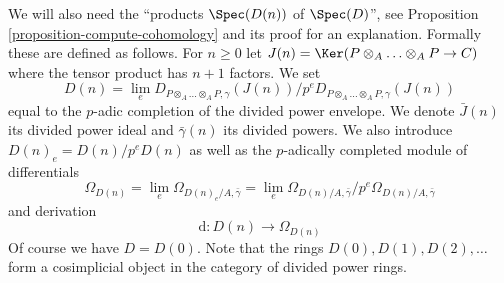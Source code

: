 \medskip\noindent
We will also need the ``products $\Spec(D(n))$ of $\Spec(D)$'', see
Proposition \ref{proposition-compute-cohomology} and its proof for an
explanation. Formally these are defined as follows. For $n \geq 0$ let
$J(n) = \Ker(P \otimes_A \ldots \otimes_A P \to C)$ where
the tensor product has $n + 1$ factors. We set
\begin{equation}
\label{equation-Dn}
D(n) = \lim_e
D_{P \otimes_A \ldots \otimes_A P, \gamma}(J(n))/
p^eD_{P \otimes_A \ldots \otimes_A P, \gamma}(J(n))
\end{equation}
equal to the $p$-adic completion of the divided power envelope.
We denote $\bar J(n)$ its divided power ideal and $\bar \gamma(n)$
its divided powers. We also introduce $D(n)_e = D(n)/p^eD(n)$ as well
as the $p$-adically completed module of differentials
\begin{equation}
\label{equation-omega-Dn}
\Omega_{D(n)} = \lim_e \Omega_{D(n)_e/A, \bar\gamma} =
\lim_e \Omega_{D(n)/A, \bar\gamma}/p^e\Omega_{D(n)/A, \bar\gamma}
\end{equation}
and derivation
\begin{equation}
\label{equation-derivation-Dn}
\text{d} : D(n) \longrightarrow \Omega_{D(n)}
\end{equation}
Of course we have $D = D(0)$. Note that the rings $D(0), D(1), D(2), \ldots$
form a cosimplicial object in the category of divided power rings.

